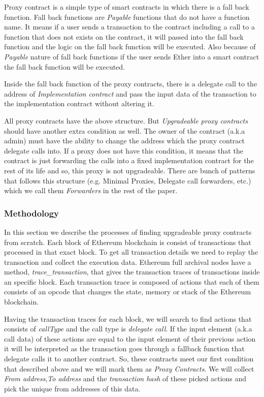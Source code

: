 Proxy contract is a simple type of smart contracts in which there is a fall back function. Fall back functions are \textit{Payable} functions that do not have a function name. It means if a user sends a transaction to the contract including a call to a function that does not exists on the contract, it will passed into the fall back function and the logic on the fall back function will be executed. Also because of \textit{Payable} nature of fall back functions if the user sends Ether into a smart contract the fall back function will be executed.

Inside the fall back function of the proxy contracts, there is a delegate call to the address of \textit{Implementation contract} and pass the input data of the transaction to the implementation contract without altering it. 

All proxy contracts have the above structure. But \textit{Upgradeable proxy contracts} should have another extra condition as well. The owner of the contract (a.k.a admin) must have the ability to change the address which the proxy contract delegate calls into. If a proxy does not have this condition, it means that the contract is just forwarding the calls into a fixed implementation contract for the rest of its life and so, this proxy is not upgradeable. There are bunch of patterns that follows this structure (e.g. Minimal Proxies, Delegate call forwarders, etc.) which we call them \textit{Forwarders} in the rest of the paper.

\subsubsection{Methodology}
In this section we describe the processes of finding upgradeable proxy contracts from scratch. Each block of Ethereum blockchain is consist of transactions that processed in that exact block. To get all transaction details we need to replay the transaction and collect the execution data. Ethereum full archival nodes have a method, \textit{trace\_transaction},  that gives the transaction traces of transactions inside an specific block. Each transaction trace is composed of actions that each of them consists of an opcode that changes the state, memory or stack of the Ethereum blockchain. 

Having the transaction traces for each block, we will search to find actions that consists of \textit{callType} and the call type is \textit{delegate call}. If the input element (a.k.a call data) of these actions are equal to the input element of their previous action it will be interpreted as the transaction goes through a fallback function that delegate calls it to another contract. So, these contracts meet our first condition that described above and we will mark them as \textit{Proxy Contracts}. We will collect \textit{From address},\textit{To address} and the \textit{transaction hash} of these picked actions and pick the unique from addresses of this data.

